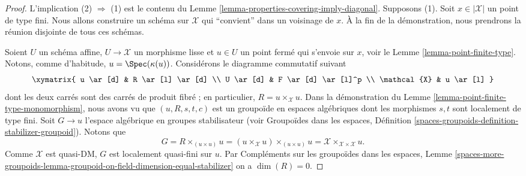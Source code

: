 \begin{proof}
L'implication (2) $\Rightarrow$ (1) est le contenu du
Lemme \ref{lemma-properties-covering-imply-diagonal}.
Supposons (1).
Soit $x \in |\mathcal{X}|$ un point de type fini. Nous allons construire un
schéma sur $\mathcal{X}$ qui ``convient'' dans un voisinage de $x$. À la fin
de la démonstration, nous prendrons la réunion disjointe de tous ces schémas.

\medskip\noindent
Soient $U$ un schéma affine, $U \to \mathcal{X}$ un morphisme lisse et
$u \in U$ un point fermé qui s'envoie sur $x$, voir le
Lemme \ref{lemma-point-finite-type}.
Notons, comme d'habitude, $u = \Spec(\kappa(u))$. Considérons le diagramme
commutatif suivant
$$
\xymatrix{
u \ar[d] & R \ar[l] \ar[d] \\
U \ar[d] & F \ar[d] \ar[l]^p \\
\mathcal{X} & u \ar[l]
}
$$
dont les deux carrés sont des carrés de produit fibré ; en particulier,
$R = u \times_\mathcal{X} u$. Dans la démonstration du
Lemme \ref{lemma-point-finite-type-monomorphism}, nous avons vu que
$(u, R, s, t, c)$ est un groupoïde en espaces algébriques dont les morphismes
$s, t$ sont localement de type fini. Soit $G \to u$ l'espace algébrique en groupes
stabilisateur (voir Groupoïdes dans les espaces, Définition
\ref{spaces-groupoids-definition-stabilizer-groupoid}).
Notons que
$$
G = R \times_{(u \times u)} u =
(u \times_\mathcal{X} u) \times_{(u \times u)} u =
\mathcal{X} \times_{\mathcal{X} \times \mathcal{X}} u.
$$
Comme $\mathcal{X}$ est quasi-DM, $G$ est localement quasi-fini sur $u$. Par
Compléments sur les groupoïdes dans les espaces, Lemme
\ref{spaces-more-groupoids-lemma-groupoid-on-field-dimension-equal-stabilizer}
on a $\dim(R) = 0$.


\end{proof}
